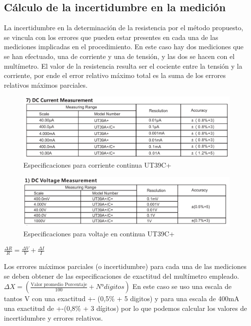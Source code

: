 \documentclass[12pt, letterpaper]{article}
\begin{document}
\subsection{Cálculo de la incertidumbre en la medición}

La incertidumbre en la determinación de la resistencia por el método propuesto, se vincula con los 
errores que pueden estar presentes en cada una de las mediciones implicadas en el procedimiento. En 
este caso hay dos mediciones que se han efectuado, una de corriente y una de tensión, y las dos se 
hacen con el multímetro. El valor de la resistencia resulta ser el cociente entre la tensión y la 
corriente, por ende el error relativo máximo total es la suma de los errores relativos máximos parciales.
\singlespacing
\begin{figure}[H]
		\centering
		\includegraphics{imagenes/DC_ut39c.png}
		\caption{Especificaciones para corriente continua UT39C+}
        \label{fig:DC_UT39C}
	\end{figure}
 \begin{figure}[H]
		\centering
		\includegraphics{imagenes/DV_ut39c.png}
		\caption{Especificaciones para voltaje en continua UT39C+}
        \label{fig:DV_UT39C}
	\end{figure}
$\frac{\Delta R}{R} = \frac{\Delta V}{V}+\frac{\Delta I}{I}$

\singlespacing
Los errores máximos parciales (o incertidumbre) para cada una de las mediciones se deben 
obtener de las especificaciones de exactitud del multímetro empleado. 
\singlespacing
$\Delta X=( \frac{\text{Valor promedio  Porcentaje}}{100} + N° digitos)$
\singlespacing
En este caso se uso una escala de tantos V con una exactitud +- (0,5\% + 5 digitos) y para una escala de 400mA una exactitud de +-(0,8\% + 3 dígitos)
por lo que podemos calcular los valores de incertidumbre y errores relativos.
\singlespacing  
\end{document}
